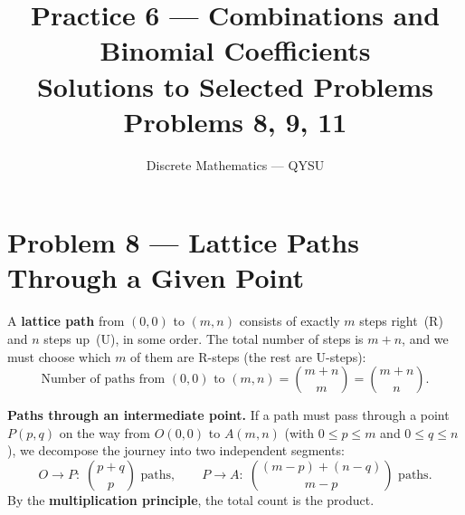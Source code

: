 \documentclass[12pt, a4paper]{article}
\title{\textbf{Practice 6 --- Combinations and Binomial Coefficients}\\[4pt]
       \large Solutions to Selected Problems\\[2pt]
       \normalsize Problems 8, 9, 11}
\author{Discrete Mathematics --- QYSU}
\date{}
\begin{document}
\maketitle
\tableofcontents
\newpage

\section{Problem 8 --- Lattice Paths Through a Given Point}

\begin{theorybox}
A \textbf{lattice path} from $(0,0)$ to $(m,n)$ consists of exactly $m$ steps
right~(R) and $n$ steps up~(U), in some order.
The total number of steps is $m + n$, and we must choose which $m$ of them
are R-steps (the rest are U-steps):
\[
  \text{Number of paths from } (0,0) \text{ to } (m,n)
  = \binom{m+n}{m} = \binom{m+n}{n}.
\]

\medskip
\textbf{Paths through an intermediate point.}\;
If a path must pass through a point $P(p,q)$ on the way from $O(0,0)$ to $A(m,n)$
(with $0 \le p \le m$ and $0 \le q \le n$), we decompose the journey into two
independent segments:
\[
  O \to P:\; \binom{p+q}{p} \text{ paths},
  \qquad
  P \to A:\; \binom{(m-p)+(n-q)}{m-p} \text{ paths}.
\]
By the \textbf{multiplication principle}, the total count is the product.

\begin{center}
\end{center}
\end{theorybox}
\end{document}
